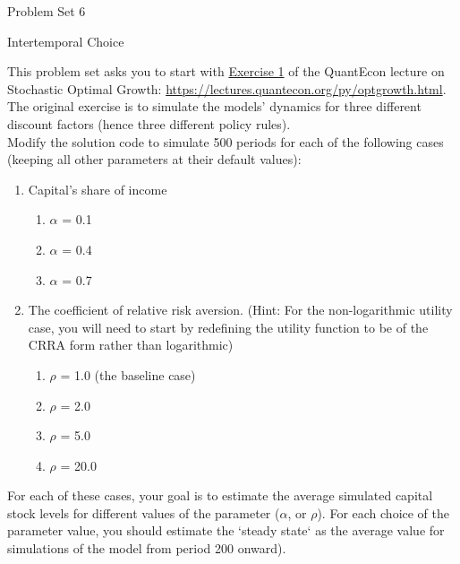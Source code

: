 \documentclass{handout}
\begin{document}
\thispagestyle{empty}

\centerline{\Large Problem Set 6}\medskip
\centerline{\large Intertemporal Choice}\medskip\medskip

\label{qSub:aDiff} This problem set asks you to start with \href{https://lectures.quantecon.org/py/optgrowth.html}{Exercise 1} of the QuantEcon lecture on Stochastic Optimal Growth: \url{https://lectures.quantecon.org/py/optgrowth.html}. The original exercise is to simulate the models' dynamics for three different discount factors (hence three different policy rules). \\

Modify the solution code to simulate 500 periods for each of the following cases (keeping all other parameters at their default values):
		\begin{enumerate}
			\item Capital's share of income
			\begin{enumerate}
				\item $\alpha$ = 0.1
				\item $\alpha$ = 0.4
				\item $\alpha$ = 0.7
			\end{enumerate}
			\item The coefficient of relative risk aversion.  (Hint: For the non-logarithmic utility case, you will need to start by redefining the utility function to be of the CRRA form rather than logarithmic)
			\begin{enumerate}
				\item $\rho$ = 1.0 (the baseline case)
				\item $\rho$ = 2.0
				\item $\rho$ = 5.0
				\item $\rho$ = 20.0
			\end{enumerate}
		\end{enumerate}

                For each of these cases, your goal is to estimate the average simulated capital stock levels for different values of the parameter ($\alpha$, or $\rho$). For each choice of the parameter value, you should estimate the `steady state` as the average value for simulations of the model from period 200 onward).
\end{document}
